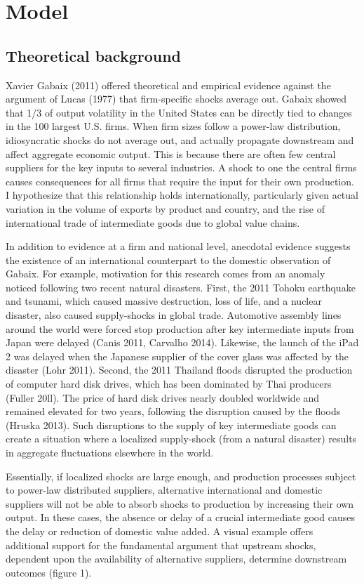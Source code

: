 \documentclass[10pt,letterpaper]{article}
\begin{document}
\section{Model} \label{models}
\subsection{Theoretical background} \label{modelstheory}
Xavier Gabaix (2011) offered theoretical and empirical evidence against the argument of Lucas (1977) that firm-specific shocks average out. Gabaix showed that 1/3 of output volatility in the United States can be directly tied to changes in the 100 largest U.S. firms. When firm sizes follow a power-law distribution, idiosyncratic shocks do not average out, and actually propagate downstream and affect aggregate economic output. This is because there are often few central suppliers for the key inputs to several industries. A shock to one the central firms causes consequences for all firms that require the input for their own production. I hypothesize that this relationship holds internationally, particularly given actual variation in the volume of exports by product and country, and the rise of international trade of intermediate goods due to global value chains. 

In addition to evidence at a firm and national level, anecdotal evidence suggests the existence of an international counterpart to the domestic observation of Gabaix. For example, motivation for this research comes from an anomaly noticed following two recent natural disasters. First, the 2011 Tohoku earthquake and tsunami, which caused massive destruction, loss of life, and a nuclear disaster, also caused supply-shocks in global trade. Automotive assembly lines around the world were forced stop production after key intermediate inputs from Japan were delayed (Canis 2011, Carvalho 2014). Likewise, the launch of the iPad 2 was delayed when the Japanese supplier of the cover glass was affected by the disaster (Lohr 2011). Second, the 2011 Thailand floods disrupted the production of computer hard disk drives, which has been dominated by Thai producers (Fuller 20ll). The price of hard disk drives nearly doubled worldwide and remained elevated for two years, following the disruption caused by the floods (Hruska 2013). Such disruptions to the supply of key intermediate goods can create a situation where a localized supply-shock (from a natural disaster) results in aggregate fluctuations elsewhere in the world.

Essentially, if localized shocks are large enough, and production processes subject to power-law distributed suppliers, alternative international and domestic suppliers will not be able to absorb shocks to production by increasing their own output. In these cases, the absence or delay of a crucial intermediate good causes the delay or reduction of domestic value added. A visual example offers additional support for the fundamental argument that upstream shocks, dependent upon the availability of alternative suppliers, determine downstream outcomes (figure 1). 
\end{document}
